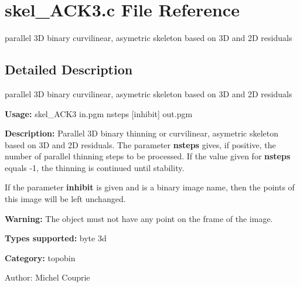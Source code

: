 \section{skel\_\-ACK3.c File Reference}
\label{skel__ACK3_8c}
parallel 3D binary curvilinear, asymetric skeleton based on 3D and 2D residuals 



\subsection{Detailed Description}
parallel 3D binary curvilinear, asymetric skeleton based on 3D and 2D residuals 

{\bf Usage:} skel\_\-ACK3 in.pgm nsteps [inhibit] out.pgm

{\bf Description:} Parallel 3D binary thinning or curvilinear, asymetric skeleton based on 3D and 2D residuals. The parameter {\bf nsteps} gives, if positive, the number of parallel thinning steps to be processed. If the value given for {\bf nsteps} equals -1, the thinning is continued until stability.

If the parameter {\bf inhibit} is given and is a binary image name, then the points of this image will be left unchanged.

{\bf Warning:} The object must not have any point on the frame of the image.

{\bf Types supported:} byte 3d

{\bf Category:} topobin

\begin{Desc}
\item[Author:]Michel Couprie \end{Desc}
